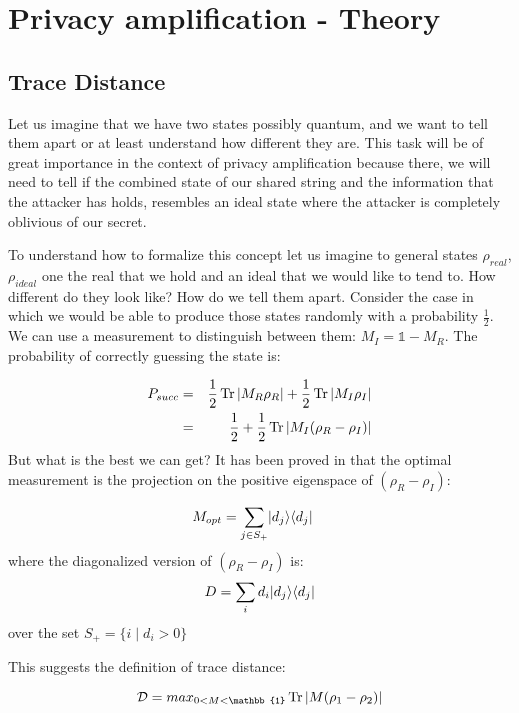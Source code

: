 \chapter{Privacy amplification - Theory}\label{chap:PA_theroy} %

\section{Trace Distance}\label{sec:Trace Distance} %


Let us imagine that we have two states possibly quantum, and we want to tell them apart or at least understand how different they are. This task will be of great importance in the context of  privacy amplification because there, we will need to tell if the combined state of our shared string and the information that the attacker has holds, resembles an ideal state where the attacker is completely oblivious of our secret.

To understand how to formalize this concept let us imagine to general states $\rho_{real}$, $\rho_{ideal}$ one the real that we hold and an ideal that we would like to tend to. How different do they look like? How do we tell them apart. Consider the case in which we would be able to produce those states randomly with a probability $\frac{1}{2}$. We can use a measurement to distinguish between them: $M_I = \mathbb{1} - M_R$. The probability of correctly guessing the state is:

\begin{eqnarray}
	P_{succ} &=& \frac{1}{2} \operatorname{Tr} |M_R \rho_R| + \frac{1}{2} \operatorname{Tr} |M_I \rho_I| \\
	&=& \frac{1}{2} + \frac{1}{2} \operatorname{Tr} |M_I (\rho_R - \rho_I)|
	\label{eq:trace_distance_Psucc}
\end{eqnarray}
But what is the best we can get? It has been proved in \cite{...} that the optimal measurement is the projection on the positive eigenspace of $(\rho_R - \rho_I)$:

\begin{eqnarray}
	M_{opt} &= \sum_{j \in S_+} \lvert d_j\rangle\langle d_j\rvert
\end{eqnarray}
where the diagonalized version of $(\rho_R - \rho_I)$ is:
\begin{equation}
	D = \sum_{i} d_i \lvert d_j\rangle\langle d_j\rvert
\end{equation}
over the set $S_+ = \{i \;|\; d_i > 0 \}$

This suggests the definition of trace distance:

\begin{definition}
	$$\mathcal{D} = max_{0<M<\mathbb{1}} \Tr |M(\rho_1 - \rho_2)|$$
\end{definition}

